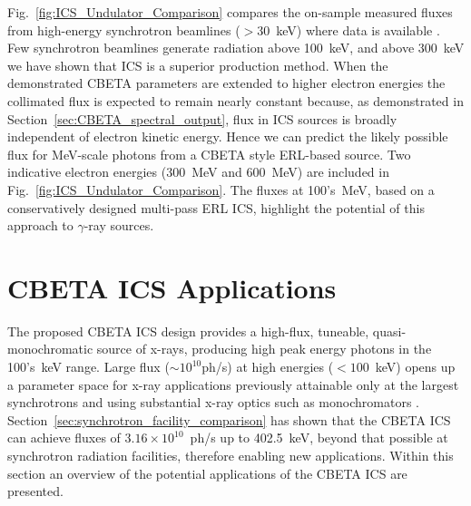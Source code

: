 \documentclass[../main.tex]{subfiles}
\begin{document}
Fig.~\ref{fig:ICS_Undulator_Comparison} compares the on-sample measured fluxes from high-energy synchrotron beamlines ($>$30~\si{\kilo\electronvolt}) where data is available \cite{apsbeamlines,esrfbeamlines,petraiiibeamlines,spring8beamlines}. Few synchrotron beamlines generate radiation above 100~\si{\kilo\electronvolt}, and above 300~\si{\kilo\electronvolt} we have shown that ICS is a superior production method. When the demonstrated CBETA parameters are extended to higher electron energies the collimated flux is expected to remain nearly constant because, as demonstrated in Section~\ref{sec:CBETA_spectral_output}, flux in ICS sources is broadly independent of electron kinetic energy. Hence we can predict the likely possible flux for \si{\mega\electronvolt}-scale photons from a CBETA style ERL-based source. Two indicative electron energies (300~\si{\mega\electronvolt} and 600~\si{\mega\electronvolt}) are included in Fig.~\ref{fig:ICS_Undulator_Comparison}. The fluxes at 100's~\si{\mega\electronvolt}, based on a conservatively designed multi-pass ERL ICS, highlight the potential of this approach to $\gamma$-ray sources. 

\section{CBETA ICS Applications}
\label{sec:CBETA_ICS_applications}

The proposed CBETA ICS design provides a high-flux, tuneable, quasi-monochromatic source of x-rays, producing high peak energy photons in the 100's~\si{\kilo\electronvolt} range. Large flux ($\sim 10^{10}$ph/\si{\second}) at high energies ($< 100$~\si{\kilo\electronvolt}) opens up a parameter space for x-ray applications previously attainable only at the largest synchrotrons and using substantial x-ray optics such as monochromators \cite{caciuffo1987monochromators}. Section~\ref{sec:synchrotron_facility_comparison} has shown that the CBETA ICS can achieve fluxes of $3.16\times 10^{10}$~ph/\si{\second} up to 402.5~\si{\kilo\electronvolt}, beyond that possible at synchrotron radiation facilities, therefore enabling new applications. Within this section an overview of the potential applications of the CBETA ICS are presented.   
\end{document}
